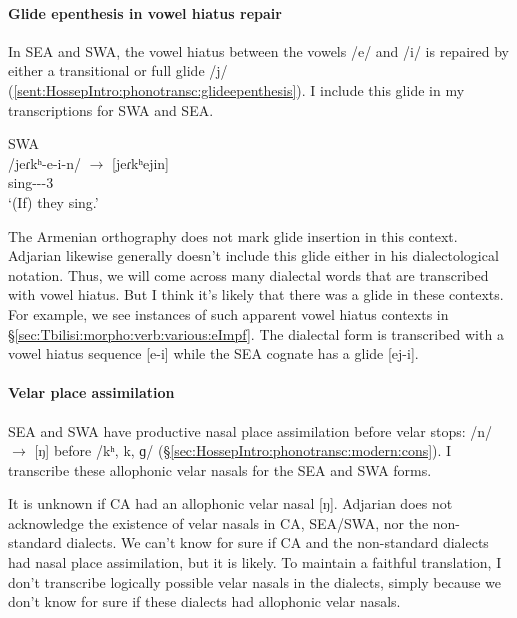 \paragraph{Glide epenthesis in vowel hiatus repair}

In SEA and SWA, the vowel hiatus between the vowels /e/ and /i/ is repaired by either a transitional or full glide /j/ (\ref{sent:HossepIntro:phonotransc:glideepenthesis}). I include this glide in my transcriptions for SWA and SEA. 

\begin{exe}
	\ex SWA \\
	\gll /jeɾkʰ-e-i-n/ $\rightarrow$ [jeɾkʰejin] \\
	sing-{\thgloss}-{\pst}-3{\pl} \\
	\trans `(If) they sing.' \label{sent:HossepIntro:phonotransc:glideepenthesis}\\
\end{exe}



The Armenian orthography does not mark glide insertion in this context. Adjarian likewise generally doesn't include this glide either in his dialectological notation. Thus, we will come across many dialectal words that are transcribed with vowel hiatus. But I think it's likely  that there was a glide in these  contexts. For example, we see instances of such apparent vowel hiatus contexts in \S\ref{sec:Tbilisi:morpho:verb:various:eImpf}. The dialectal form is transcribed with a vowel hiatus sequence [e-i] while the SEA cognate has a glide [ej-i]. 


\paragraph{Velar place assimilation}

SEA and SWA have productive nasal place assimilation before velar stops: /n/ $\rightarrow$ [ŋ] before /kʰ, k, ɡ/ (\S\ref{sec:HossepIntro:phonotransc:modern:cons}). I transcribe these allophonic velar nasals for the SEA and SWA forms. 

It is unknown if CA had an allophonic velar nasal [ŋ]. Adjarian does not acknowledge the existence of velar nasals in CA, SEA/SWA, nor the non-standard dialects. We can't know for sure if CA and the non-standard dialects had nasal place assimilation, but it is likely. To maintain a faithful translation, I don't transcribe logically possible velar nasals in the dialects, simply because we don't know for sure if these dialects had allophonic velar nasals. 

